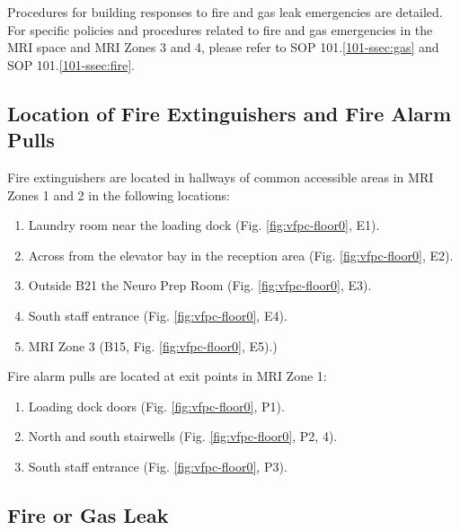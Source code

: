 \documentclass[11pt]{article}
\begin{document}
Procedures for building responses to fire and gas leak emergencies are detailed. For specific policies and procedures related to fire and gas emergencies in the MRI space and MRI Zones 3 and 4, please refer to SOP 101.\ref{101-ssec:gas} and SOP 101.\ref{101-ssec:fire}.

\subsection{Location of Fire Extinguishers and Fire Alarm Pulls}
\label{ssec:fire-ext-loc}

Fire extinguishers are located in hallways of common accessible areas in MRI Zones 1 and 2 in the following locations:

\begin{enumerate}
    \item Laundry room near the loading dock (Fig. \ref{fig:vfpc-floor0}, E1).
    \item Across from the elevator bay in the reception area (Fig. \ref{fig:vfpc-floor0}, E2).
    \item Outside B21 the Neuro Prep Room (Fig. \ref{fig:vfpc-floor0}, E3).
	\item South staff entrance (Fig. \ref{fig:vfpc-floor0}, E4).
    \item MRI Zone 3 (B15, Fig. \ref{fig:vfpc-floor0}, E5).)
\end{enumerate}


Fire alarm pulls are located at exit points in MRI Zone 1:

\begin{enumerate}
    \item Loading dock doors (Fig. \ref{fig:vfpc-floor0}, P1).
    \item North and south stairwells (Fig. \ref{fig:vfpc-floor0}, P2, 4).
    \item South staff entrance (Fig. \ref{fig:vfpc-floor0}, P3).
\end{enumerate}


\subsection{Fire or Gas Leak}
\label{ssec:fire-evac}
\end{document}
